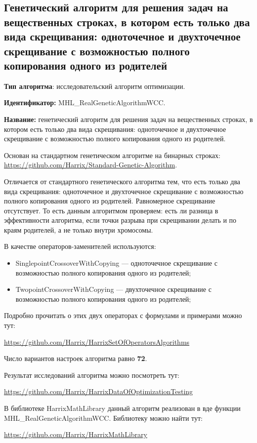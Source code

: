 \subsection{Генетический алгоритм для решения задач на вещественных строках, в котором есть только два вида скрещивания: одноточечное и двухточечное скрещивание с возможностью полного копирования одного из родителей}\label{HarrixOptimizationAlgorithms:MHL_RealGeneticAlgorithmWCC}

\textbf{Тип алгоритма}: исследовательский алгоритм оптимизации.

\textbf{Идентификатор:} MHL\_RealGeneticAlgorithmWCC.

\textbf{Название:} генетический алгоритм для решения задач на вещественных строках, в котором есть только два вида скрещивания: одноточечное и двухточечное скрещивание с возможностью полного копирования одного из родителей.

Основан на стандартном генетическом алгоритме на бинарных строках:  \href{https://github.com/Harrix/Standard-Genetic-Algorithm}{https://github.com/Harrix/Standard-Genetic-Algorithm}. 

Отличается от стандартного генетического алгоритма тем, что есть только два вида скрещивания: одноточечное и двухточечное скрещивание с возможностью полного копирования одного из родителей. Равномерное скрещивание отсутствует. То есть данным алгоритмом проверяем: есть ли разница в эффективности алгоритма, если точки разрыва при скрещивании делать и по краям родителей, а не только внутри хромосомы.

В качестве операторов-заменителей используются:
\begin{itemize}
\item SinglepointCrossoverWithCopying --- одноточечное скрещивание с возможностью полного копирования одного из родителей;
\item TwopointCrossoverWithCopying --- двухточечное скрещивание с возможностью полного копирования одного из родителей;
\end{itemize}

Подробно прочитать о этих двух операторах с формулами и примерами можно тут:

\href{https://github.com/Harrix/HarrixSetOfOperatorsAlgorithms}{https://github.com/Harrix/HarrixSetOfOperatorsAlgorithms}

Число вариантов настроек алгоритма равно \textbf{72}.

Результат исследований алгоритма можно посмотреть тут:

\href{https://github.com/Harrix/HarrixDataOfOptimizationTesting}{https://github.com/Harrix/HarrixDataOfOptimizationTesting}

В библиотеке HarrixMathLibrary данный алгоритм реализован в вде функции MHL\_RealGeneticAlgorithmWCC. Библиотеку можно найти тут:

\href{https://github.com/Harrix/HarrixMathLibrary}{https://github.com/Harrix/HarrixMathLibrary}